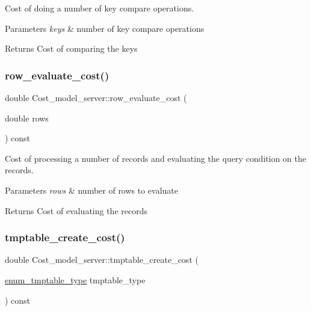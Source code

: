 Cost of doing a number of key compare operations.


\begin{DoxyParams}{Parameters}
{\em keys} & number of key compare operations\\
\hline
\end{DoxyParams}
\begin{DoxyReturn}{Returns}
Cost of comparing the keys 
\end{DoxyReturn}
\mbox{\label{classCost__model__server_ab1e112ce95b61d96c291af41541ff2e2}} 
\subsubsection{\texorpdfstring{row\+\_\+evaluate\+\_\+cost()}{row\_evaluate\_cost()}}
{\footnotesize\ttfamily double Cost\+\_\+model\+\_\+server\+::row\+\_\+evaluate\+\_\+cost (\begin{DoxyParamCaption}\item[{double}]{rows }\end{DoxyParamCaption}) const\hspace{0.3cm}{\ttfamily [inline]}}

Cost of processing a number of records and evaluating the query condition on the records.


\begin{DoxyParams}{Parameters}
{\em rows} & number of rows to evaluate\\
\hline
\end{DoxyParams}
\begin{DoxyReturn}{Returns}
Cost of evaluating the records 
\end{DoxyReturn}
\mbox{\label{classCost__model__server_a52f14b9994d65fe01fd7bdf1b9391470}} 
\subsubsection{\texorpdfstring{tmptable\+\_\+create\+\_\+cost()}{tmptable\_create\_cost()}}
{\footnotesize\ttfamily double Cost\+\_\+model\+\_\+server\+::tmptable\+\_\+create\+\_\+cost (\begin{DoxyParamCaption}\item[{\mbox{\hyperlink{classCost__model__server_a140ad6035a21dbe363f69eb4b5ea98c0}{enum\+\_\+tmptable\+\_\+type}}}]{tmptable\+\_\+type }\end{DoxyParamCaption}) const\hspace{0.3cm}{\ttfamily [inline]}}

